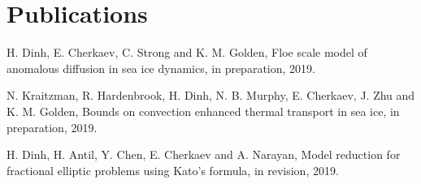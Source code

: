 \newcommand{\arxiv}[1]{[\href{http://arxiv.org/abs/#1}{arXiv:#1}]}


\setcounter{numPubs}{1}
\setcounter{pubCounter}{\value{numPubs}}


\section{\sc Publications}
\begin{etaremune}[start=\value{pubCounter}]
   \item[  ] 
  H. Dinh, E. Cherkaev, C. Strong and K. M. Golden, Floe scale model of anomalous diffusion in sea ice dynamics, in preparation, 2019.
  \item[  ]
  N. Kraitzman, R. Hardenbrook, H. Dinh, N. B. Murphy, E. Cherkaev, J. Zhu and K. M. Golden, Bounds on convection enhanced thermal transport in sea ice, in preparation, 2019.
  \item[  ]
  H. Dinh, H. Antil, Y. Chen, E. Cherkaev and A. Narayan, Model reduction for fractional elliptic problems using Kato's formula, in revision, 2019.

 \end{etaremune}



